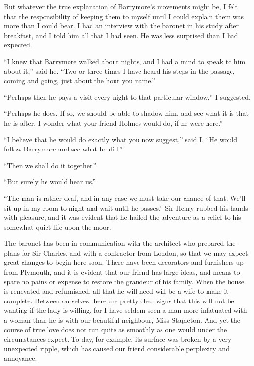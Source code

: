 \documentclass[paper=a5,BCOR=7mm,twoside,DIV=calc,12pt,usegeometry,openany,chapterprefix,endperiod,headings=big]{scrbook} %
\begin{document}
But whatever the true explanation of Barrymore's movements might be, I felt that the responsibility of keeping them to myself until I could explain them was more than I could bear. I had an interview with the baronet in his study after breakfast, and I told him all that I had seen. He was less surprised than I had expected.

\enquote{I knew that Barrymore walked about nights, and I had a mind to speak to him about it,} said he. \enquote{Two or three times I have heard his steps in the passage, coming and going, just about the hour you name.}

\enquote{Perhaps then he pays a visit every night to that particular window,} I suggested.

\enquote{Perhaps he does. If so, we should be able to shadow him, and see what it is that he is after. I wonder what your friend Holmes would do, if he were here.}

\enquote{I believe that he would do exactly what you now suggest,} said I. \enquote{He would follow Barrymore and see what he did.}

\enquote{Then we shall do it together.}

\enquote{But surely he would hear us.}

\enquote{The man is rather deaf, and in any case we must take our chance of that. We'll sit up in my room to-night and wait until he passes.} Sir Henry rubbed his hands with pleasure, and it was evident that he hailed the adventure as a relief to his somewhat quiet life upon the moor.

The baronet has been in communication with the architect who prepared the plans for Sir Charles, and with a contractor from London, so that we may expect great changes to begin here soon. There have been decorators and furnishers up from Plymouth, and it is evident that our friend has large ideas, and means to spare no pains or expense to restore the grandeur of his family. When the house is renovated and refurnished, all that he will need will be a wife to make it complete. Between ourselves there are pretty clear signs that this will not be wanting if the lady is willing, for I have seldom seen a man more infatuated with a woman than he is with our beautiful neighbour, Miss Stapleton. And yet the course of true love does not run quite as smoothly as one would under the circumstances expect. To-day, for example, its surface was broken by a very unexpected ripple, which has caused our friend considerable perplexity and annoyance.
\end{document}
